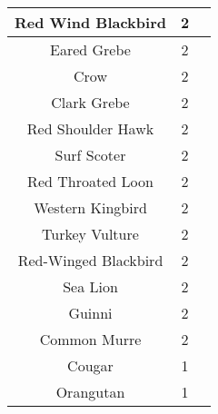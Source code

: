 \begin{tabular}{c|c|c}
Red Wind Blackbird & 2 \\ \hline
Eared Grebe & 2 \\ \hline
Crow & 2 \\ \hline
Clark Grebe & 2 \\ \hline
Red Shoulder Hawk & 2 \\ \hline
Surf Scoter & 2 \\ \hline
Red Throated Loon & 2 \\ \hline
Western Kingbird & 2 \\ \hline
Turkey Vulture & 2 \\ \hline
Red-Winged Blackbird & 2 \\ \hline
Sea Lion & 2 \\ \hline
Guinni & 2 \\ \hline
Common Murre & 2 \\ \hline
Cougar & 1 \\ \hline
Orangutan & 1 \\ \hline

\end{tabular}
